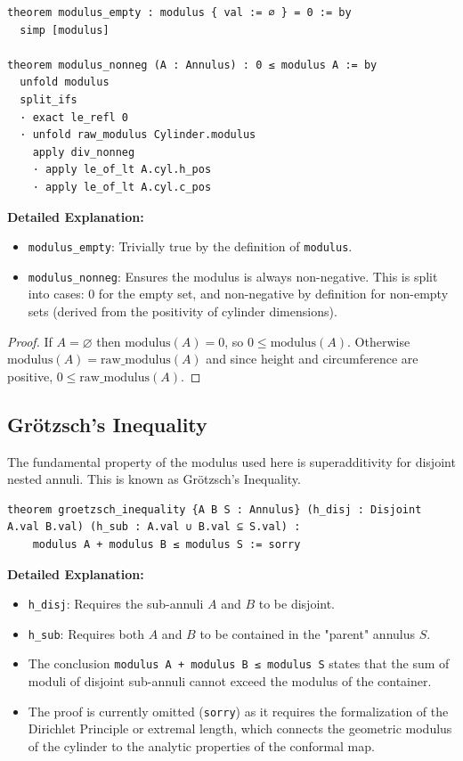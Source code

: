 \begin{lstlisting}[language=Lean]
theorem modulus_empty : modulus { val := ∅ } = 0 := by
  simp [modulus]

theorem modulus_nonneg (A : Annulus) : 0 ≤ modulus A := by
  unfold modulus
  split_ifs
  · exact le_refl 0
  · unfold raw_modulus Cylinder.modulus
    apply div_nonneg
    · apply le_of_lt A.cyl.h_pos
    · apply le_of_lt A.cyl.c_pos
\end{lstlisting}

\noindent
\textbf{Detailed Explanation:}
\begin{itemize}
    \item \texttt{modulus\_empty}: Trivially true by the definition of \texttt{modulus}.
    \item \texttt{modulus\_nonneg}: Ensures the modulus is always non-negative. This is split into cases: 0 for the empty set, and non-negative by definition for non-empty sets (derived from the positivity of cylinder dimensions).
\end{itemize}

\begin{proof}
If $A=\varnothing$ then $\text{modulus}(A)=0$, so $0\le \text{modulus}(A)$. Otherwise $\text{modulus}(A)=\text{raw\_modulus}(A)$ and since height and circumference are positive, $0\le \text{raw\_modulus}(A)$.
\end{proof}

\subsection{Grötzsch's Inequality}

The fundamental property of the modulus used here is superadditivity for disjoint nested annuli. This is known as Grötzsch's Inequality.

\begin{lstlisting}[language=Lean]
theorem groetzsch_inequality {A B S : Annulus} (h_disj : Disjoint A.val B.val) (h_sub : A.val ∪ B.val ⊆ S.val) :
    modulus A + modulus B ≤ modulus S := sorry
\end{lstlisting}

\noindent
\textbf{Detailed Explanation:}
\begin{itemize}
    \item \texttt{h\_disj}: Requires the sub-annuli $A$ and $B$ to be disjoint.
    \item \texttt{h\_sub}: Requires both $A$ and $B$ to be contained in the "parent" annulus $S$.
    \item The conclusion \texttt{modulus A + modulus B ≤ modulus S} states that the sum of moduli of disjoint sub-annuli cannot exceed the modulus of the container.
    \item The proof is currently omitted (\texttt{sorry}) as it requires the formalization of the Dirichlet Principle or extremal length, which connects the geometric modulus of the cylinder to the analytic properties of the conformal map.
\end{itemize}

